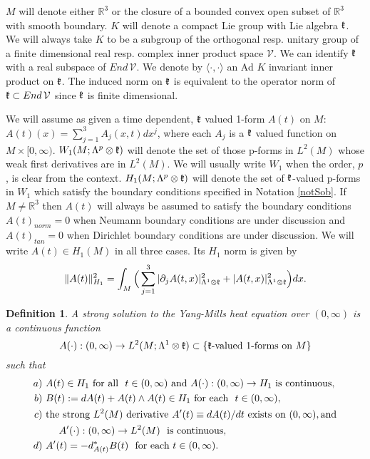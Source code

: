 \documentclass[12pt]{article}
\newtheorem{definition}[theorem]{Definition}
\def \L{\Lambda}
\def \<{\langle}
\def \>{\rangle}
\def \R{\mathbb R}
\def \kf{\frak k}
\def \p{\partial}
\def \beq{\begin{equation}}
\def \eeq{\end{equation}}
\def \V{\mathcal V}
\numberwithin{equation}{section}
\begin{document}
$M$ will denote  either $\R^3$ or the closure of a  bounded convex open subset of $\R^3$
 with smooth boundary. $K$ will denote a compact Lie group with Lie algebra $\kf$.  We will always take $K$ to be a subgroup of the orthogonal
 resp. unitary group of a finite dimensional real resp. complex   inner product  space $\V$. 
  We can identify $\kf$ with a real subspace  of $End\, \V$.  
  We denote by $\<\cdot, \cdot\>$ an Ad $K$ invariant inner product on $\kf$.    
  The induced norm on $\kf$  is   equivalent to the operator norm of $\kf \subset End\, \V$ since $\kf$ is finite dimensional.
 
  We will assume as given a time dependent, $\kf$ valued 1-form  $A(t)$ on $M$:
  $A(t)(x) = \sum_{j=1}^3 A_j(x,t) dx^j$,  where each $A_j$ is a $\kf$  
  valued function on $M\times [0, \infty)$.   
  $W_1(M; \L^p\otimes \kf)$ will denote the 
   set of those  p-forms in $L^2(M)$ whose weak first derivatives are in $L^2(M)$.
   We will usually write $W_1$    when the order, $p$, is clear from the context.
   $ H_1(M;\L^p\otimes \kf)$ will denote the set of  $\kf$-valued p-forms  in $ W_1$
   which satisfy the boundary conditions  specified  in Notation \ref{notSob}.
   If $M \ne \R^3$ then  $A(t)$ will always be assumed to satisfy the boundary conditions
   $A(t)_{norm} =0$ when Neumann boundary conditions are under discussion and $A(t)_{tan} =0$ when Dirichlet boundary conditions are under discussion. We will write $A(t) \in H_1(M)$ in all three cases. 
 Its $H_1$ norm is given by 
   \beq
   \| A(t)\|_{H_1}^2 = \int_M\Big(\sum_{j=1}^3 |\p_j A(t, x)|_{\L^1\otimes \kf}^2 
                       + |A(t,x)|_{\L^1\otimes \kf}^2 \Big)dx.  \label{ymh5}
   \eeq

 
\begin{definition}\label{defstrsol} {\rm   
A {\it strong solution} to the Yang-Mills heat  equation over $(0, \infty)$ 
 is a continuous function 
\beq
A(\cdot): (0,\infty) \rightarrow L^2(M;\L^1\otimes \kf) 
                              \subset \{\frak k\text{-valued 1-forms on}\ M \}   \label{ymh6}   
\eeq
such that
\begin{align}
a)&\  A(t) \in H_1 
           \ \text{for all}\ \ t\in(0,\infty)\ \text{and}\ A(\cdot):(0,\infty)\rightarrow H_1 
                                                             \    \text{is continuous},     \notag\\
b)& \ B(t):= dA(t) +A(t)\wedge A(t)  \in H_1 
             \ \text{for each}\ \  t\in (0,\infty),\notag\\ 
c)& \  \text{the strong $L^2(M)$ derivative $A'(t) \equiv dA(t)/dt $}\ 
\text{exists on}\ (0,\infty),   \text{and}     \notag\\
&\ \ \ \ \ A'(\cdot) : (0,\infty) \rightarrow L^2(M)\ \ \text{is continuous}, \notag\\    
d)& \  A'(t) = - d_{A(t)}^* B(t)\ \ \text{for each}\ t \in(0, \infty).           \label{ymh10}     
\end{align}
}
\end{definition} 
\end{document}
